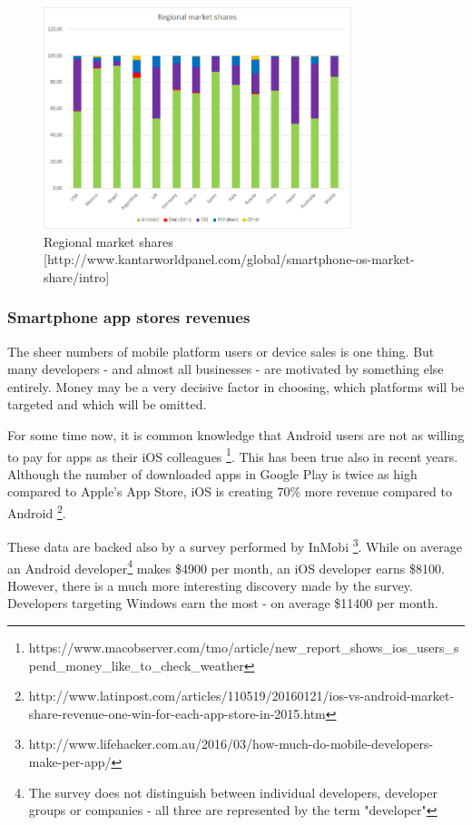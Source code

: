 \documentclass[english,master,public,dept460,male,cpdeclaration,oneside]{diploma}
\begin{document}
\begin{figure}
	\centering\includegraphics[width=0.8\textwidth]{Figures/regionalMarketShares.png}
	\caption{Regional market shares [http://www.kantarworldpanel.com/global/smartphone-os-market-share/intro]}
\end{figure}

\subsubsection{Smartphone app stores revenues}
The sheer numbers of mobile platform users or device sales is one thing. But many developers - and almost all businesses - are motivated by something else entirely. Money may be a very decisive factor in choosing, which platforms will be targeted and which will be omitted. 

For some time now, it is common knowledge that Android users are not as willing to pay for apps as their iOS colleagues \footnote{https://www.macobserver.com/tmo/article/new\_report\_shows\_ios\_users\_spend\_money\_like\_to\_check\_weather}. This has been true also in recent years. Although the number of downloaded apps in Google Play is twice as high compared to Apple’s App Store, iOS is creating 70\% more revenue compared to Android \footnote{http://www.latinpost.com/articles/110519/20160121/ios-vs-android-market-share-revenue-one-win-for-each-app-store-in-2015.htm}. 

These data are backed also by a survey performed by InMobi \footnote{http://www.lifehacker.com.au/2016/03/how-much-do-mobile-developers-make-per-app/}. While on average an Android developer\footnote{The survey does not distinguish between individual developers, developer groups or companies - all three are represented by the term "developer"} makes \$4900 per month, an iOS developer earns \$8100. However, there is a much more interesting discovery made by the survey. Developers targeting Windows earn the most - on average \$11400 per month.
\end{document}
